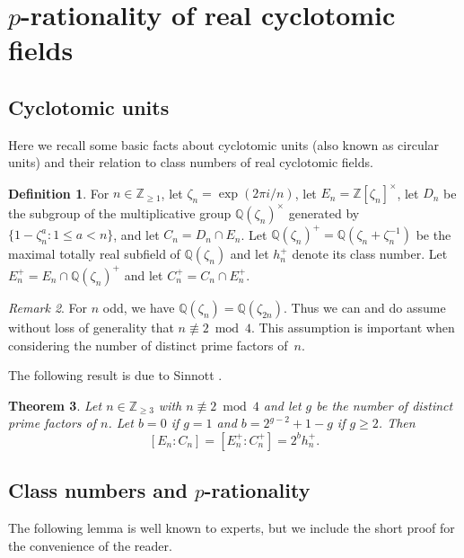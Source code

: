 \documentclass[12pt, a4paper, usenames]{amsart}
\newcommand{\Z}{\mathbb{Z}}
\newcommand{\Q}{\mathbb{Q}}
\theoremstyle{plain}
\newtheorem{theorem}{Theorem}[section]
\theoremstyle{remark}
\newtheorem{remark}[theorem]{Remark}
\theoremstyle{definition}
\newtheorem{definition}[theorem]{Definition}
\begin{document}
\section{$p$-rationality of real cyclotomic fields}\label{sec:real-cyclo}

\subsection{Cyclotomic units}\label{subsec:cyclotomic-units}
Here we recall some basic facts about cyclotomic units (also known as circular units)
and their relation to class numbers of real cyclotomic fields. 

\begin{definition}\label{def:cyclo-units-n}
For $n \in \Z_{\geq 1}$, let $\zeta_{n}=\exp(2\pi i / n)$, 
let $E_{n} = \Z[\zeta_{n}]^{\times}$, let 
$D_{n}$ be the subgroup of the multiplicative group $\Q(\zeta_{n})^{\times}$
generated by $\{ 1-\zeta_{n}^{a} : 1 \leq a < n \}$,
and let $C_{n} = D_{n} \cap E_{n}$.
Let $\Q(\zeta_{n})^{+}=\Q(\zeta_{n}+\zeta_{n}^{-1})$ 
be the maximal totally real subfield of $\Q(\zeta_{n})$ and
let $h_{n}^{+}$ denote its class number.
Let $E_{n}^{+} = E_{n} \cap \Q(\zeta_{n})^{+}$ and let 
$C_{n}^{+} = C_{n} \cap E_{n}^{+}$.
\end{definition}

\begin{remark}\label{rmk:n-not-2-mod-4}
For $n$ odd, we have $\Q(\zeta_{n})=\Q(\zeta_{2n})$.
Thus we can and do assume without loss of generality that $n \not \equiv 2 \bmod{4}$.
This assumption is 
important when considering the number of distinct prime factors of~$n$.
\end{remark}

The following result is due to Sinnott 
\cite[Theorem and (4.2)]{MR485778}.

\begin{theorem}\label{thm:sinnott-cyclo}
Let $n \in \Z_{\geq 3}$ with $n \not \equiv 2 \bmod 4$ and
let $g$ be the number of distinct prime factors of $n$.
Let $b=0$ if $g=1$ and $b=2^{g-2}+1-g$ if $g \geq 2$.
Then
\[
[E_{n} : C_{n}] 
=[E_{n}^{+} : C_{n}^{+}] 
= 2^{b}h_{n}^{+}.
\]
\end{theorem}

\subsection{Class numbers and $p$-rationality}\label{subsec:class-no-p-rat}
The following lemma is well known to experts, but we include the short proof for the convenience of the reader.
\end{document}

